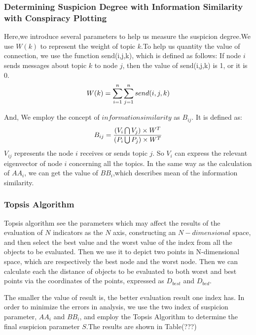 \documentclass[12pt]{article}
\begin{document}
\begin{itemize}
\begin{itemize}
\subsubsection{Determining Suspicion Degree with Information Similarity with Conspiracy Plotting}

Here,we introduce several parameters to help us measure the suspicion degree.We use $W(k)$ to represent the weight of topic $k$.To help us quantity the value of connection, we use the function send(i,j,k), which is defined as follows: If node $i$ sends messages about topic $k$ to node $j$, then the value of send(i,j,k) is 1, or it is 0.
\begin{equation}
\centering
W(k) = \sum_{i=1}^n \sum_{j=1}^n send(i,j,k)
\end{equation}

And, We employ the concept of $information similarity$ as  $B_{ij}$. It is defined as:
\begin{equation}
\centering
B_{ij} = \frac{(V_i \bigcap V_j) \times W^T}{(P_i \bigcup P_j) \times W^T}
\end{equation}
$V_{ij}$ represents the node $i$ receives or sends topic $j$. So $V_i$ can express the relevant eigenvector of node $i$ concerning all the topics. In the same way as the calculation of $AA_i$, we can get the value of $BB_i$,which describes mean of the information similarity.

\subsubsection{Topsis Algorithm}
	Topsis algorithm see the parameters which may affect the results of the evaluation of $N$ indicators as the $N$ axis, constructing an $N-dimensional$ space, and then select the best value and the worst value of the index from all the objects to be evaluated. Then we use it to depict two points in N-dimensional space, which are respectively the best node and the worst node. Then we can calculate each the distance of objects to be evaluated to both worst and best points via the coordinates of the points, expressed as $D_{best}$ and $D_{bed}$.

	The smaller the value of result is, the better evaluation result one index has. In order to minimize the errors in analysis, we use the two index of suspicion parameter, $AA_i$ and $BB_i$, and employ the Topsis Algorithm to determine the final suspicion parameter $S$.The results are shown in Table(???)
	

\end{itemize}
\end{itemize}
\end{document}
